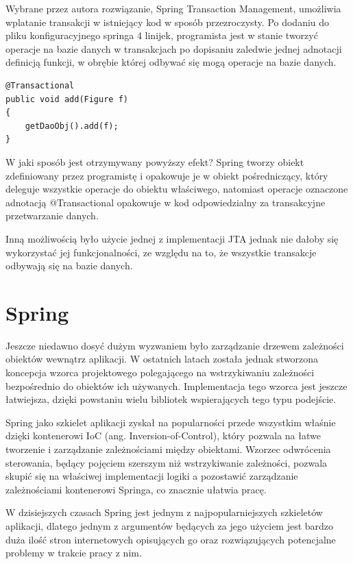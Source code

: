 Wybrane przez autora rozwiązanie, Spring Transaction Management, umożliwia wplatanie transakcji w istniejący kod w sposób przezroczysty. Po dodaniu do pliku konfiguracyjnego springa 4 linijek, programista jest w stanie tworzyć operacje na bazie danych w transakcjach po dopisaniu zaledwie jednej adnotacji definicją funkcji, w obrębie której odbywać się mogą operacje na bazie danych.

\begin{lstlisting}
@Transactional
public void add(Figure f)
{
	getDaoObj().add(f);
}
\end{lstlisting}

W jaki sposób jest otrzymywany powyższy efekt? Spring tworzy obiekt zdefiniowany przez programistę i opakowuje je w obiekt pośredniczący, który deleguje wszystkie operacje do obiektu właściwego, natomiast operacje oznaczone adnotacją @Transactional opakowuje w kod odpowiedzialny za transakcyjne przetwarzanie danych.

Inną możliwością było użycie jednej z implementacji JTA jednak nie dałoby się wykorzystać jej funkcjonalności, ze względu na to, że wszystkie transakcje odbywają się na bazie danych.

\section{Spring}
Jeszcze niedawno dosyć dużym wyzwaniem było zarządzanie drzewem zależności obiektów wewnątrz aplikacji. W ostatnich latach została jednak stworzona koncepcja wzorca projektowego polegającego na wstrzykiwaniu zależności bezpośrednio do obiektów ich używanych. Implementacja tego wzorca jest jeszcze łatwiejsza, dzięki powstaniu wielu bibliotek wspierających tego typu podejście.

\newpage
Spring jako szkielet aplikacji zyskał na popularności przede wszystkim właśnie dzięki kontenerowi IoC (ang. Inversion-of-Control), który pozwala na łatwe tworzenie i zarządzanie zależnościami między obiektami. Wzorzec odwrócenia sterowania, będący pojęciem szerszym niż wstrzykiwanie zależności, pozwala skupić się na właściwej implementacji logiki a pozostawić zarządzanie zależnościami kontenerowi Springa, co znacznie ułatwia pracę.


W dzisiejszych czasach Spring jest jednym z najpopularniejszych szkieletów aplikacji, dlatego jednym z argumentów będących za jego użyciem jest bardzo duża ilość stron internetowych opisujących go oraz rozwiązujących potencjalne problemy w trakcie pracy z nim. 

